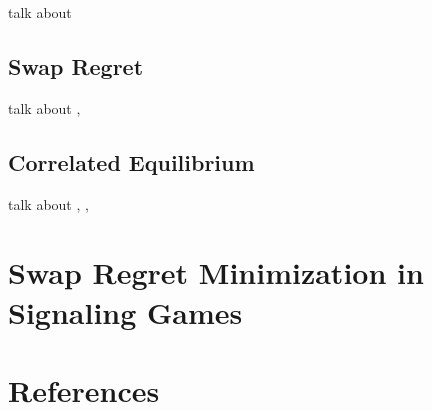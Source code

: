 \documentclass{article}
\begin{document}
talk about \cite{littlestone1994weighted}

\subsection{Swap Regret}

talk about \cite{blum2007external}, \cite{mohri2014conditional}

\subsection{Correlated Equilibrium}

talk about \cite{aumann1974subjectivity}, \cite{aumann1987correlated}, \cite{foster1997calibrated}

\section{Swap Regret Minimization in Signaling Games}

\section{References}



\end{document}
